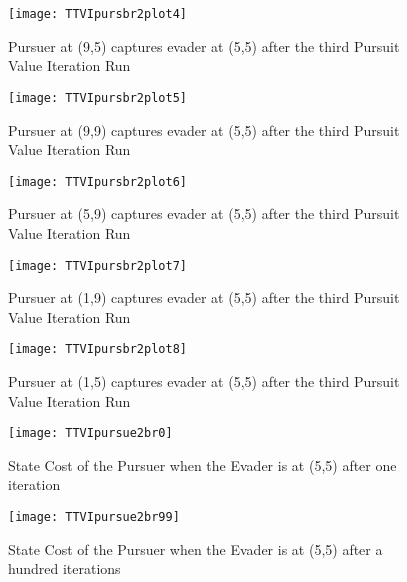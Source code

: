 \begin{figure}
\vspace{2.4in}
\centering
\texttt{[image: TTVIpursbr2plot4]}
\caption{Pursuer at (9,5) captures evader at (5,5) after the third Pursuit Value Iteration Run}
\label{TTVIpursbr2plot4}
\end{figure}
\clearpage
\newpage

\begin{figure}
\vspace{2.4in}
\centering
\texttt{[image: TTVIpursbr2plot5]}
\caption{Pursuer at (9,9) captures evader at (5,5) after the third Pursuit Value Iteration Run}
\label{TTVIpursbr2plot5}
\end{figure}
\clearpage
\newpage

\begin{figure}
\vspace{2.4in}
\centering
\texttt{[image: TTVIpursbr2plot6]}
\caption{Pursuer at (5,9) captures evader at (5,5) after the third Pursuit Value Iteration Run}
\label{TTVIpursbr2plot6}
\end{figure}
\clearpage
\newpage

\begin{figure}
\vspace{2.4in}
\centering
\texttt{[image: TTVIpursbr2plot7]}
\caption{Pursuer at (1,9) captures evader at (5,5) after the third Pursuit Value Iteration Run}
\label{TTVIpursbr2plot7}
\end{figure}
\clearpage
\newpage

\begin{figure}
\vspace{2.4in}
\centering
\texttt{[image: TTVIpursbr2plot8]}
\caption{Pursuer at (1,5) captures evader at (5,5) after the third Pursuit Value Iteration Run}
\label{TTVIpursbr2plot8}
\end{figure}
\clearpage
\newpage

\begin{figure}
\vspace{2.4in}
\centering
\texttt{[image: TTVIpursue2br0]}
\caption{State Cost of the Pursuer when the Evader is at (5,5) after one iteration}
\label{TTVIpursue2br0}
\end{figure}
\clearpage
\newpage

\begin{figure}
\vspace{2.4in}
\centering
\texttt{[image: TTVIpursue2br99]}
\caption{State Cost of the Pursuer when the Evader is at (5,5) after a hundred iterations}
\label{TTVIpursue2br99}
\end{figure}
\clearpage
\newpage

